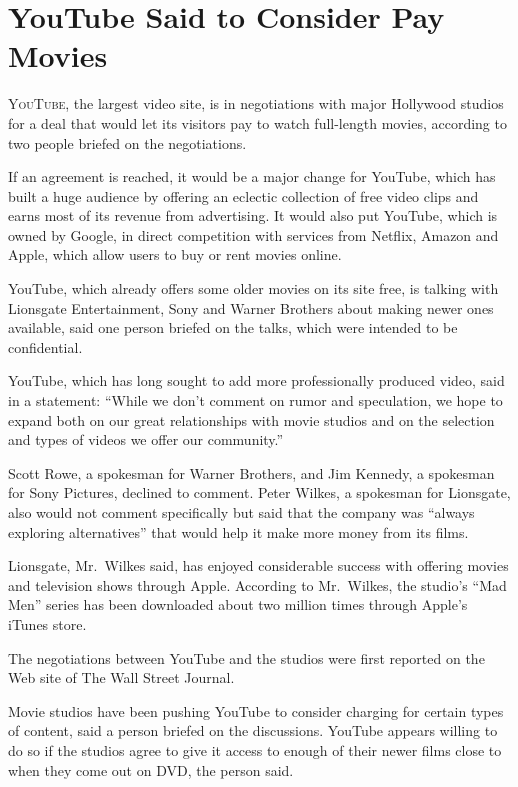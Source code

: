 ﻿\documentclass[12pt]{article}
\begin{document}
\section{YouTube Said to Consider Pay Movies}

\lettrine{Y}{ouTube}, the largest video site, is in negotiations with major Hollywood studios for a
deal that would let its visitors pay to watch full-length movies, according to two people briefed on
the negotiations.

If an agreement is reached, it would be a major change for YouTube, which has built a huge audience
by offering an eclectic collection of free video clips and earns most of its revenue from
advertising. It would also put YouTube, which is owned by Google, in direct competition with
services from Netflix, Amazon and Apple, which allow users to buy or rent movies online.

YouTube, which already offers some older movies on its site free, is talking with Lionsgate
Entertainment, Sony and Warner Brothers about making newer ones available, said one person briefed
on the talks, which were intended to be confidential.

YouTube, which has long sought to add more professionally produced video, said in a statement:
``While we don't comment on rumor and speculation, we hope to expand both on our great relationships
with movie studios and on the selection and types of videos we offer our community.''

Scott Rowe, a spokesman for Warner Brothers, and Jim Kennedy, a spokesman for Sony Pictures,
declined to comment. Peter Wilkes, a spokesman for Lionsgate, also would not comment specifically
but said that the company was ``always exploring alternatives'' that would help it make more money
from its films.

Lionsgate, Mr.~Wilkes said, has enjoyed considerable success with offering movies and television
shows through Apple. According to Mr.~Wilkes, the studio's ``Mad Men'' series has been downloaded
about two million times through Apple's iTunes store.

The negotiations between YouTube and the studios were first reported on the Web site of The Wall
Street Journal.

Movie studios have been pushing YouTube to consider charging for certain types of content, said a
person briefed on the discussions. YouTube appears willing to do so if the studios agree to give it
access to enough of their newer films close to when they come out on DVD, the person said.
\end{document}
